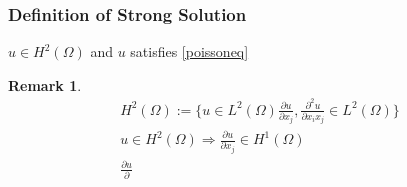 \documentclass[a4paper,12pt]{article}
\newtheorem{remark}{Remark}[]
\begin{document}
\subsubsection{Definition of Strong Solution}
$u \in H^2(\Omega)$ and $u$ satisfies \eqref{poissoneq}
\begin{remark}
	\begin{equation}\nonumber
	\begin{aligned}
	H^2(\Omega):= \{ u\in L^2(\Omega) \frac{\partial u}{\partial x_j},\frac{\partial^2 u}{\partial x_i x_j} \in L^2(\Omega)\}\\
	u \in H^2(\Omega) \Rightarrow \frac{\partial u}{\partial x_j} \in H^1(\Omega)\\
	\frac{\partial u}{\partial}
	\end{aligned}
	\end{equation}
\end{remark}
\end{document}

